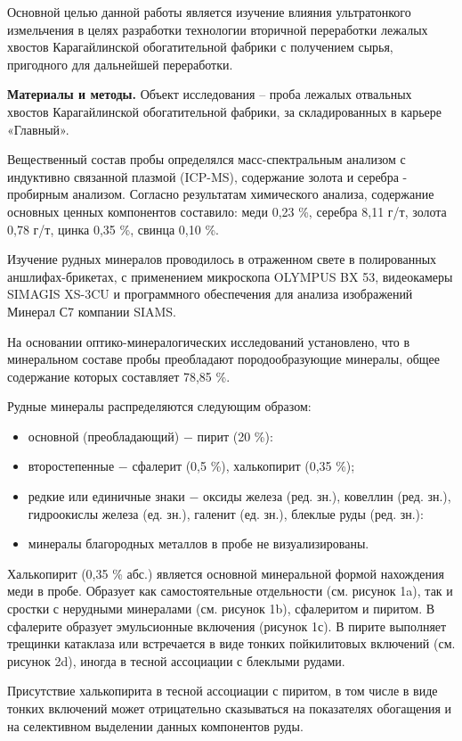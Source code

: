 Основной целью данной работы является изучение влияния ультратонкого
измельчения в целях разработки технологии вторичной переработки лежалых
хвостов Карагайлинской обогатительной фабрики с получением сырья,
пригодного для дальнейшей переработки.

{\bfseries Материалы и методы.} Объект исследования -- проба лежалых
отвальных хвостов Карагайлинской обогатительной фабрики, за
складированных в карьере «Главный».

Вещественный состав пробы определялся масс-спектральным анализом с
индуктивно связанной плазмой (ICP-MS), содержание золота и серебра -
пробирным анализом. Согласно результатам химического анализа, содержание
основных ценных компонентов составило: меди 0,23 \%, серебра 8,11 г/т,
золота 0,78 г/т, цинка 0,35 \%, свинца 0,10 \%.

Изучение рудных минералов проводилось в отраженном свете в полированных
аншлифах-брикетах, с применением микроскопа OLYMPUS BX 53, видеокамеры
SIMAGIS XS-3CU и программного обеспечения для анализа изображений
Минерал С7 компании SIAMS.

На основании оптико-минералогических исследований установлено, что в
минеральном составе пробы преобладают породообразующие минералы, общее
содержание которых составляет 78,85 \%.

Рудные минералы распределяются следующим образом:

\begin{itemize}
\item
  основной (преобладающий) − пирит (20 \%):
\item
  второстепенные − сфалерит (0,5 \%), халькопирит (0,35 \%);
\item
  редкие или единичные знаки − оксиды железа (ред. зн.), ковеллин (ред.
  зн.), гидроокислы железа (ед. зн.), галенит (ед. зн.), блеклые руды
  (ред. зн.):
\item
  минералы благородных металлов в пробе не визуализированы.
\end{itemize}

Халькопирит (0,35 \% абс.) является основной минеральной формой
нахождения меди в пробе. Образует как самостоятельные отдельности (см.
рисунок 1a), так и сростки с нерудными минералами (см. рисунок 1b),
сфалеритом и пиритом. В сфалерите образует эмульсионные включения
(рисунок 1с). В пирите выполняет трещинки катаклаза или встречается в
виде тонких пойкилитовых включений (см. рисунок 2d), иногда в тесной
ассоциации с блеклыми рудами.

Присутствие халькопирита в тесной ассоциации с пиритом, в том числе в
виде тонких включений может отрицательно сказываться на показателях
обогащения и на селективном выделении данных компонентов руды.

